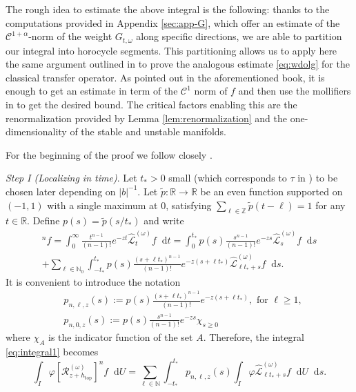 \documentclass[11pt,letterpaper]{amsart}
\newcommand \cL {{\mathcal L}}
\newcommand \cR {{\mathcal R}}
\newcommand \R {{ \mathbb R}}
\newcommand \Z {{ \mathbb Z}}
\newcommand \cC {{\mathscr{C}}}
\newcommand*{\diff}{\mathop{}\!\mathrm{d}}
\DeclareMathOperator{\topp}{top}
\theoremstyle{definition}
\newcommand{\marginnoter}[1]
           {\mbox{}\marginpar{\tiny\raggedright\hspace{0pt}{{\bf R}$\blacktriangleright$  {\color{magenta} #1}}}}
\begin{document}
 The rough idea to estimate the above integral is the following: thanks to the computations provided in Appendix \ref{sec:app-G}, which offer an estimate of the ${\cC}^{1+\alpha}$-norm of the weight $G_{t,\omega}$ along specific directions, we are able to partition our integral into horocycle segments. This partitioning allows us to apply here the same argument outlined in \cite[Section 5.7]{DeKiLi} to prove the analogous estimate \eqref{eq:wdolg} for the classical transfer operator. As pointed out in the aforementioned book, it is enough to get an estimate in term of the $\cC^1$ norm of $f$ and then use the mollifiers in \cite[Lemma 5.3]{DeKiLi} to get the desired bound. The critical factors enabling this are the renormalization provided by Lemma \ref{lem:renormalization} and the one-dimensionality of the stable and unstable manifolds. %
 
 For the beginning of the proof we follow closely  \cite[Section 5.7]{DeKiLi}.
 
\textit{Step I (Localizing in time)}. Let $t_*>0$ small (which corresponds to $\tau$ in \cite{DeKiLi}) to be chosen later depending on $|b|^{-1}$. Let $\tilde p:\R \to \R$ be an even function supported on $(-1,1)$ with a single maximum at $0$, satisfying $\sum_{\ell \in \Z} \tilde p(t-\ell)=1$ for any $t \in \R$. Define $p(s)=\tilde p(s/t_*)$ and write 
\begin{multline*}
 [\cR_{z+h_{\topp}}^{(\omega)}]^n f=\int_0^{\infty}  \frac{t^{n-1}}{(n-1) !} e^{-z t} \hat \cL^{(\omega)}_t f \diff t= \int_0^{t_*} p(s) \frac{s^{n-1}}{(n-1) !} e^{-z s}\hat\cL^{(\omega)}_s f \diff s \\
 + \sum_{\ell \in \mathbb{N}_0} \int_{-{t_*}}^{t_*} p(s) \frac{(s+\ell {t_*})^{n-1}}{(n-1) !} e^{-z(s+\ell {t_*})} \hat\cL^{(\omega)}_{\ell {t_*}+s}f \diff s.
\end{multline*}
It is convenient to introduce the notation
\[
\begin{split}
&p_{n, \ell, z}(s):=p(s) \frac{(s+\ell {t_*})^{n-1}}{(n-1) !} e^{-z(s+\ell {t_*})}, \text { for } \ell \geqslant 1, \\
&p_{n, 0, z}(s):=p(s) \frac{s^{n-1}}{(n-1) !} e^{-z s} {\chi}_{s \geqslant 0}
\end{split}
\]
where $\chi_{A}$ is the indicator function of the set $A$. Therefore, the integral \eqref{eq:integral1} becomes
\begin{equation}\label{eq:integral2}
\int_I \varphi[\cR^{(\omega)}_{z+h_{\topp}}]^n f \diff U=  \sum_{\ell \in \mathbb{N}} \int_{-{t_*}}^{t_*} p_{n, \ell, z}(s) \int_I \varphi \hat\cL^{(\omega)}_{\ell {t_*}+s}f \diff U \diff s.
\end{equation}
\end{document}
